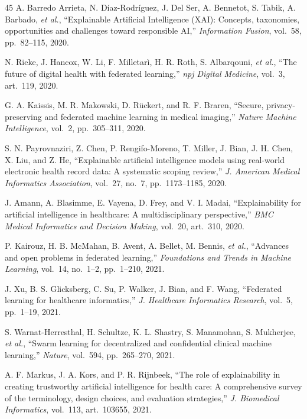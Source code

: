 \documentclass[11pt,a4paper]{article}
\begin{document}
\begin{thebibliography}{45}
 A. Barredo Arrieta, N. D\'iaz-Rodr\'iguez, J. Del Ser,
A. Bennetot, S. Tabik, A. Barbado, \emph{et al.}, ``Explainable Artificial
Intelligence (XAI): Concepts, taxonomies, opportunities and challenges toward
responsible AI,'' \emph{Information Fusion}, vol.~58, pp.~82--115, 2020.

 N. Rieke, J. Hancox, W. Li, F. Milletar\`i, H. R. Roth,
S. Albarqouni, \emph{et al.}, ``The future of digital health with federated
learning,'' \emph{npj Digital Medicine}, vol.~3, art.~119, 2020.

 G. A. Kaissis, M. R. Makowski, D. R\"uckert, and R. F. Braren,
``Secure, privacy-preserving and federated machine learning in medical
imaging,'' \emph{Nature Machine Intelligence}, vol.~2, pp.~305--311, 2020.

 S. N. Payrovnaziri, Z. Chen, P. Rengifo-Moreno, T. Miller,
J. Bian, J. H. Chen, X. Liu, and Z. He, ``Explainable artificial intelligence
models using real-world electronic health record data: A systematic scoping
review,'' \emph{J. American Medical Informatics Association}, vol.~27, no.~7,
pp.~1173--1185, 2020.

 J. Amann, A. Blasimme, E. Vayena, D. Frey, and V. I. Madai,
``Explainability for artificial intelligence in healthcare: A multidisciplinary
perspective,'' \emph{BMC Medical Informatics and Decision Making}, vol.~20,
art.~310, 2020.

 P. Kairouz, H. B. McMahan, B. Avent, A. Bellet, M. Bennis,
\emph{et al.}, ``Advances and open problems in federated learning,''
\emph{Foundations and Trends in Machine Learning}, vol.~14, no.~1--2,
pp.~1--210, 2021.

 J. Xu, B. S. Glicksberg, C. Su, P. Walker, J. Bian, and F. Wang,
``Federated learning for healthcare informatics,'' \emph{J. Healthcare
Informatics Research}, vol.~5, pp.~1--19, 2021.

 S. Warnat-Herresthal, H. Schultze, K. L. Shastry, S. Manamohan,
S. Mukherjee, \emph{et al.}, ``Swarm learning for decentralized and confidential
clinical machine learning,'' \emph{Nature}, vol.~594, pp.~265--270, 2021.

 A. F. Markus, J. A. Kors, and P. R. Rijnbeek, ``The role of
explainability in creating trustworthy artificial intelligence for health care:
A comprehensive survey of the terminology, design choices, and evaluation
strategies,'' \emph{J. Biomedical Informatics}, vol.~113, art.~103655, 2021.


\end{thebibliography}
\end{document}
